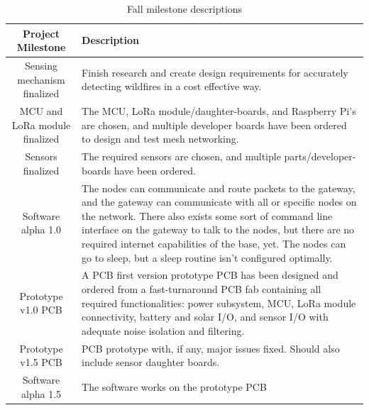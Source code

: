\documentclass[titlepage, 11pt, letterpaper]{article}
\begin{document}
%
%
\begin{table}[H]
    \centering
    \begin{tabularx}{\linewidth}{|c|X|}
        \hline
        Project Milestone & Description 
        \\
        \hline\hline
        Sensing mechanism finalized &
        Finish research and create design requirements for accurately detecting wildfires in a cost effective way.
        \\
        
        
        \hline
        MCU and LoRa module finalized &
        The MCU, LoRa module/daughter-boards, and Raspberry Pi's are chosen, and multiple developer boards have been ordered to design and test mesh networking.
        \\
        
        \hline
        Sensors finalized 
        & The required sensors are chosen, and multiple parts/developer-boards have been ordered.
        \\
        
        \hline
        Software alpha 1.0 
        & The nodes can communicate and route packets to the gateway, and the gateway can communicate with all or specific nodes on the network. There also exists some sort of command line interface on the gateway to talk to the nodes, but there are no required internet capabilities of the base, yet. The nodes can go to sleep, but a sleep routine isn't configured optimally.
        \\
        
        \hline
        Prototype v1.0 PCB 
        & A PCB first version prototype PCB has been designed and ordered from a fast-turnaround PCB fab containing all required functionalities: power subsystem, MCU, LoRa module connectivity, battery and solar I/O, and sensor I/O with adequate noise isolation and filtering.
        \\
        
        \hline
        Prototype v1.5 PCB
        & PCB prototype with, if any, major issues fixed. Should also include sensor daughter boards.
        \\
        
        \hline
        Software alpha 1.5
        & The software works on the prototype PCB
        \\
        
        \hline
    \end{tabularx}
    \caption{Fall milestone descriptions}
\end{table}
\end{document}
